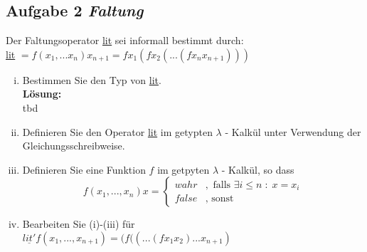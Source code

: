 \documentclass[11pt,a4paper,ngerman]{article}
\begin{document}
\subsection*{Aufgabe 2 \mdseries\itshape Faltung}
Der Faltungsoperator \underline{lit} sei informall bestimmt durch:\\
\underline{lit} $= f(x_1,...x_n) x_{n+1} = f x_1 (f x_2 (... (f x_n x_{n+1}) ))$\\

\begin{enumerate}[(i)]
   \item Bestimmen Sie den Typ von \underline{lit}.\\
   \textbf{Lösung:}\\
      tbd

   \item Definieren Sie den Operator \underline{lit} im getypten 
      $\lambda$ - Kalkül unter Verwendung der Gleichungsschreibweise.\\

   \item Definieren Sie eine Funktion $f$ im getpyten $\lambda$ - Kalkül, so
      dass 
      $$
         f(x_1, ... , x_n) x = \left\{\begin{array}{lr}
            wahr &, \text{ falls }\exists i \leq n \; : \; x=x_i\\
            false &, \text{ sonst}
         \end{array}\right.
      $$

   \item Bearbeiten Sie (i)-(iii) für \\
      $\underline{lit'} f (x_1,...,x_{n+1}) = (f ((...(f x_1 x_2) ... x_{n+1})$

\end{enumerate}

\label{LastPage}
\end{document}
